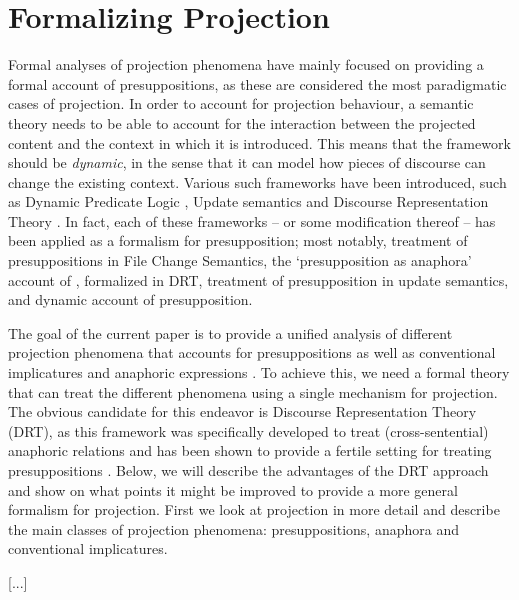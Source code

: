 \section{Formalizing Projection}

Formal analyses of projection phenomena have mainly focused on providing
a formal account of presuppositions, as these are considered the most
paradigmatic cases of projection.  In order to account for projection
behaviour, a semantic theory needs to be able to account for the interaction
between the projected content and the context in which it is introduced.
This means that the framework should be \emph{dynamic}, in the sense that it
can model how pieces of discourse can change the existing context. Various
such frameworks have been introduced, such as Dynamic Predicate Logic
\citep[DPL;][]{groenendijk1991dynamic}, Update semantics
\citep{veltman1991defaults,veltman1996defaults} and Discourse Representation
Theory \citep[DRT;][]{kamp1981theory,kamp1993discourse}. In fact, each of
these frameworks -- or some modification thereof -- has been applied as
a formalism for presupposition; most notably, \cites{heim1983projection}
treatment of presuppositions in File Change Semantics, the `presupposition
as anaphora' account of \citet{sandt1992presupposition}, formalized in DRT,
\cites{zeevat1992presupposition} treatment of presupposition in update
semantics, and \cites{beaver2001presupposition} dynamic account of
presupposition.  

The goal of the current paper is to provide a unified
analysis of different projection phenomena that accounts for presuppositions
as well as conventional implicatures and anaphoric expressions
\citep[cf.][]{simons2010projects}. To achieve this, we need a formal theory
that can treat the different phenomena using a single mechanism for
projection. The obvious candidate for this endeavor is Discourse
Representation Theory (DRT), as this framework was specifically developed to
treat (cross-sentential) anaphoric relations \citep{kamp1993discourse} and
has been shown to provide a fertile setting for treating presuppositions
\citep{sandt1992presupposition,geurts1999presuppositions}. Below, we will
describe the advantages of the DRT approach and show on what points it might
be improved to provide a more general formalism for projection.  First we
look at projection in more detail and describe the main classes of
projection phenomena: presuppositions, anaphora and conventional
implicatures.

[...]

